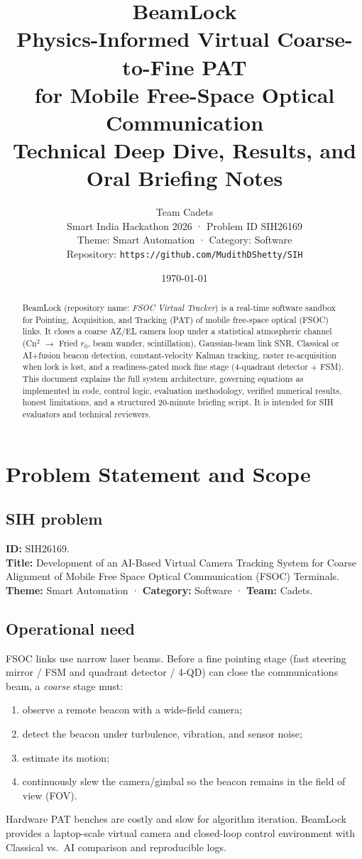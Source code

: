 \documentclass[11pt,a4paper]{article}
\title{\textbf{BeamLock}\\[0.4em]
\large Physics-Informed Virtual Coarse-to-Fine PAT\\
for Mobile Free-Space Optical Communication\\[0.6em]
\normalsize Technical Deep Dive, Results, and Oral Briefing Notes}
\author{Team Cadets\\
Smart India Hackathon 2026 · Problem ID SIH26169\\
Theme: Smart Automation · Category: Software\\
Repository: \texttt{https://github.com/MudithDShetty/SIH}}
\date{\today}
\begin{document}
\maketitle
\begin{abstract}
BeamLock (repository name: \emph{FSOC Virtual Tracker}) is a real-time software sandbox for Pointing, Acquisition, and Tracking (PAT) of mobile free-space optical (FSOC) links.
It closes a coarse AZ/EL camera loop under a statistical atmospheric channel (Cn$^2$ $\rightarrow$ Fried $r_0$, beam wander, scintillation), Gaussian-beam link SNR, Classical or AI+fusion beacon detection, constant-velocity Kalman tracking, raster re-acquisition when lock is lost, and a readiness-gated mock fine stage (4-quadrant detector + FSM).
This document explains the full system architecture, governing equations as implemented in code, control logic, evaluation methodology, verified numerical results, honest limitations, and a structured 20-minute briefing script.
It is intended for SIH evaluators and technical reviewers.
\end{abstract}

\tableofcontents
\newpage

\section{Problem Statement and Scope}

\subsection{SIH problem}
\textbf{ID:} SIH26169.\\
\textbf{Title:} Development of an AI-Based Virtual Camera Tracking System for Coarse Alignment of Mobile Free Space Optical Communication (FSOC) Terminals.\\
\textbf{Theme:} Smart Automation · \textbf{Category:} Software · \textbf{Team:} Cadets.

\subsection{Operational need}
FSOC links use narrow laser beams.
Before a fine pointing stage (fast steering mirror / FSM and quadrant detector / 4-QD) can close the communications beam, a \emph{coarse} stage must:
\begin{enumerate}[leftmargin=1.4em]
  \item observe a remote beacon with a wide-field camera;
  \item detect the beacon under turbulence, vibration, and sensor noise;
  \item estimate its motion;
  \item continuously slew the camera/gimbal so the beacon remains in the field of view (FOV).
\end{enumerate}
Hardware PAT benches are costly and slow for algorithm iteration.
BeamLock provides a laptop-scale virtual camera and closed-loop control environment with Classical vs.\ AI comparison and reproducible logs.
\end{document}

